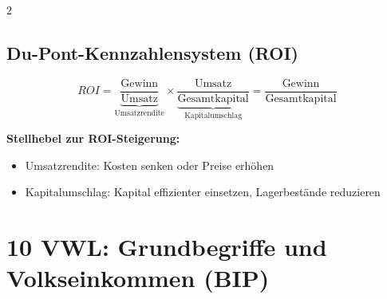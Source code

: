 \documentclass[10pt,a4paper]{article}
\begin{document}
\begin{multicols}{2}
\subsection{Du-Pont-Kennzahlensystem (ROI)}

\begin{formelbox}
\[
ROI = \underbrace{\frac{\text{Gewinn}}{\text{Umsatz}}}_{\text{Umsatzrendite}} \times \underbrace{\frac{\text{Umsatz}}{\text{Gesamtkapital}}}_{\text{Kapitalumschlag}}
= \frac{\text{Gewinn}}{\text{Gesamtkapital}}
\]
\end{formelbox}

\textbf{Stellhebel zur ROI-Steigerung:}
\begin{itemize}[noitemsep, leftmargin=*]
  \item Umsatzrendite: Kosten senken oder Preise erhöhen
  \item Kapitalumschlag: Kapital effizienter einsetzen, Lagerbestände reduzieren
\end{itemize}

\end{multicols}

\newpage

\section{10 \quad VWL: Grundbegriffe und Volkseinkommen (BIP)}
\end{document}
